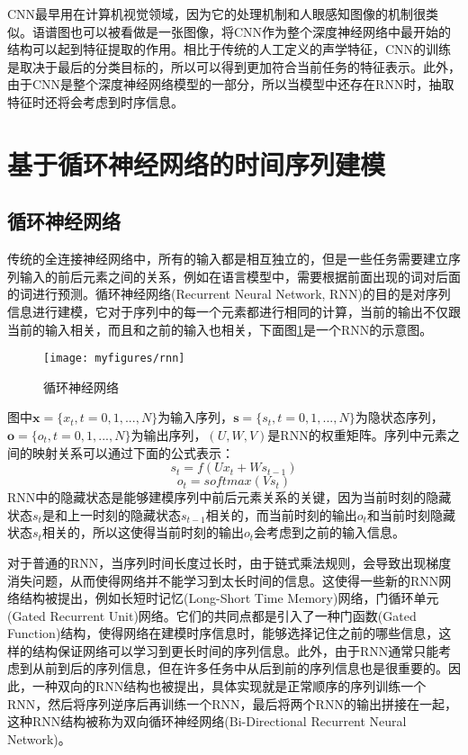 CNN最早用在计算机视觉领域，因为它的处理机制和人眼感知图像的机制很类似。语谱图也可以被看做是一张图像，将CNN作为整个深度神经网络中最开始的结构可以起到特征提取的作用。相比于传统的人工定义的声学特征，CNN的训练是取决于最后的分类目标的，所以可以得到更加符合当前任务的特征表示。此外，由于CNN是整个深度神经网络模型的一部分，所以当模型中还存在RNN时，抽取特征时还将会考虑到时序信息。

\section{基于循环神经网络的时间序列建模}
\label{sec:rnn_seq_model}

\subsection{循环神经网络}
\label{ssec:rnn}

传统的全连接神经网络中，所有的输入都是相互独立的，但是一些任务需要建立序列输入的前后元素之间的关系，例如在语言模型中，需要根据前面出现的词对后面的词进行预测。循环神经网络(Recurrent Neural Network, RNN)的目的是对序列信息进行建模，它对于序列中的每一个元素都进行相同的计算，当前的输出不仅跟当前的输入相关，而且和之前的输入也相关，下面图\ref{fig:rnn}是一个RNN的示意图。

\begin{figure}[htb] %
    \centering
    \texttt{[image: myfigures/rnn]}
    \caption{循环神经网络}
    \label{fig:rnn}
\end{figure}

图中$\mathbf{x}=\{x_t, t=0,1,...,N\}$为输入序列，$\mathbf{s}=\{s_t, t=0,1,...,N\}$为隐状态序列，$\mathbf{o}=\{o_t, t=0,1,...,N\}$为输出序列，$(U, W, V)$是RNN的权重矩阵。序列中元素之间的映射关系可以通过下面的公式表示：
\begin{equation}
\label{equ:rnn_cal_state}
    s_t = f(Ux_t + Ws_{t-1})
\end{equation}
\begin{equation}
\label{equ:rnn_cal_output}
    o_t = softmax(Vs_t)
\end{equation}
RNN中的隐藏状态是能够建模序列中前后元素关系的关键，因为当前时刻的隐藏状态$s_t$是和上一时刻的隐藏状态$s_{t-1}$相关的，而当前时刻的输出$o_t$和当前时刻隐藏状态$s_t$相关的，所以这使得当前时刻的输出$o_t$会考虑到之前的输入信息。

对于普通的RNN，当序列时间长度过长时，由于链式乘法规则，会导致出现梯度消失问题，从而使得网络并不能学习到太长时间的信息。这使得一些新的RNN网络结构被提出，例如长短时记忆(Long-Short Time Memory)网络，门循环单元(Gated Recurrent Unit)网络。它们的共同点都是引入了一种门函数(Gated Function)结构，使得网络在建模时序信息时，能够选择记住之前的哪些信息，这样的结构保证网络可以学习到更长时间的序列信息。此外，由于RNN通常只能考虑到从前到后的序列信息，但在许多任务中从后到前的序列信息也是很重要的。因此，一种双向的RNN结构也被提出，具体实现就是正常顺序的序列训练一个RNN，然后将序列逆序后再训练一个RNN，最后将两个RNN的输出拼接在一起，这种RNN结构被称为双向循环神经网络(Bi-Directional Recurrent Neural Network)。

